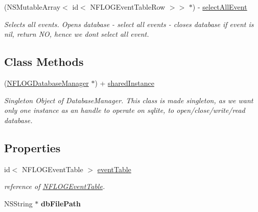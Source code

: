 \begin{DoxyCompactItemize}
\mbox{\label{interface_n_f_l_o_g_database_manager_a3a6c4da285f4a305700bce008d82c288}} 
(N\+S\+Mutable\+Array$<$ id$<$ N\+F\+L\+O\+G\+Event\+Table\+Row $>$$>$ $\ast$) -\/ \hyperlink{interface_n_f_l_o_g_database_manager_a3a6c4da285f4a305700bce008d82c288}{select\+All\+Event}
\begin{DoxyCompactList}\small\item\em Selects all events. Opens database -\/ select all events -\/ closes database if event is nil, return NO, hence we dont select all event. \end{DoxyCompactList}\end{DoxyCompactItemize}
\subsection*{Class Methods}
\begin{DoxyCompactItemize}
\item 
\mbox{\label{interface_n_f_l_o_g_database_manager_a30813003be61506175fc411043d12b8d}} 
(\hyperlink{interface_n_f_l_o_g_database_manager}{N\+F\+L\+O\+G\+Database\+Manager} $\ast$) + \hyperlink{interface_n_f_l_o_g_database_manager_a30813003be61506175fc411043d12b8d}{shared\+Instance}
\begin{DoxyCompactList}\small\item\em Singleton Object of Database\+Manager. This class is made singleton, as we want only one instance as an handle to operate on sqlite, to open/close/write/read database. \end{DoxyCompactList}\end{DoxyCompactItemize}
\subsection*{Properties}
\begin{DoxyCompactItemize}
\item 
id$<$ N\+F\+L\+O\+G\+Event\+Table $>$ \hyperlink{interface_n_f_l_o_g_database_manager_a0c2d72e86efb3d5b8eccef89af7b5662}{event\+Table}
\begin{DoxyCompactList}\small\item\em reference of \hyperlink{class_n_f_l_o_g_event_table-p}{N\+F\+L\+O\+G\+Event\+Table}. \end{DoxyCompactList}\item 
\mbox{\label{interface_n_f_l_o_g_database_manager_ac0b4cda7d0c2ecf6767f74c308cf55c6}} 
N\+S\+String $\ast$ {\bfseries db\+File\+Path}
\end{DoxyCompactItemize}



